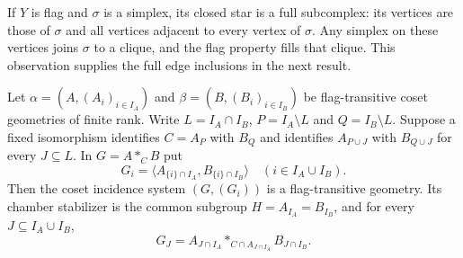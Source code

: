 If $Y$ is flag and $\sigma$ is a simplex, its closed star is a full
subcomplex: its vertices are those of $\sigma$ and all vertices adjacent
to every vertex of $\sigma$. Any simplex on these vertices joins
$\sigma$ to a clique, and the flag property fills that clique.
This observation supplies the full edge inclusions in the next result.

\begin{theorem}\label{thm:amalgam}
Let $\alpha=(A,(A_i)_{i\in I_A})$ and
$\beta=(B,(B_i)_{i\in I_B})$ be flag-transitive coset geometries
of finite rank. Write $L=I_A\cap I_B$, $P=I_A\setminus L$ and
$Q=I_B\setminus L$. Suppose a fixed isomorphism identifies
$C=A_P$ with $B_Q$ and identifies $A_{P\cup J}$ with $B_{Q\cup J}$
for every $J\subseteq L$.
In $G=A*_C B$ put
\[
 G_i=\langle A_{\{i\}\cap I_A},B_{\{i\}\cap I_B}\rangle
 \quad(i\in I_A\cup I_B).
\]
Then the coset incidence system $(G,(G_i))$ is a flag-transitive
geometry. Its chamber stabilizer is the common subgroup
$H=A_{I_A}=B_{I_B}$, and for every $J\subseteq I_A\cup I_B$,
\[
 G_J=A_{J\cap I_A}*_{C\cap A_{J\cap I_A}}B_{J\cap I_B}.
\]
\end{theorem}
